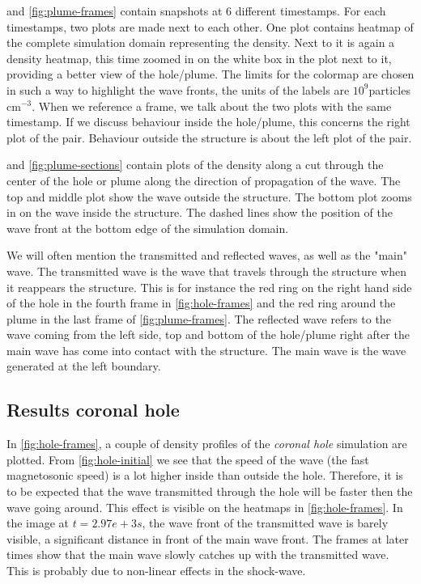  and \cref{fig:plume-frames} contain snapshots at 6 different timestamps.
For each timestamps, two plots are made next to each other.
One plot contains heatmap of the complete simulation domain representing the density. Next to it is again a density heatmap, this time zoomed in on the white box in the plot next to it, providing a better view of the hole/plume.
The limits for the colormap are chosen in such a way to highlight the wave fronts, the units of the labels are $10^9$particles cm$^{-3}$.
When we reference a frame, we talk about the two plots with the same timestamp. If we discuss behaviour inside the hole/plume, this concerns the right plot of the pair.
Behaviour outside the structure is about the left plot of the pair.

 and \cref{fig:plume-sections} contain plots of the density along a cut through the center of the hole or plume along the direction of propagation of the wave.
The top and middle plot show the wave outside the structure. The bottom plot zooms in on the wave inside the structure.
The dashed lines show the position of the wave front at the bottom edge of the simulation domain.

We will often mention the transmitted and reflected waves, as well as the "main" wave. 
The transmitted wave is the wave that travels through the structure when it reappears the structure.
This is for instance the red ring on the right hand side of the hole in the fourth frame in \cref{fig:hole-frames} and the red ring around the plume in the last frame of \cref{fig:plume-frames}.
The reflected wave refers to the wave coming from the left side, top and bottom of the hole/plume right after the main wave has come into contact with the structure.
The main wave is the wave generated at the left boundary.


\subsection{Results coronal hole}

In \cref{fig:hole-frames}, a couple of density profiles of the \emph{coronal hole} simulation are plotted.
From \cref{fig:hole-initial} we see that the speed of the wave (the fast magnetosonic speed) is a lot higher inside than outside the hole.
Therefore, it is to be expected that the wave transmitted through the hole will be faster then the wave going around.
This effect is visible on the heatmaps in \cref{fig:hole-frames}. 
In the image at $t=2.97e+3s$, the wave front of the transmitted wave is barely visible, a significant distance in front of the main wave front.
The frames at later times show that the main wave slowly catches up with the transmitted wave. This is probably due to non-linear effects in the shock-wave.

